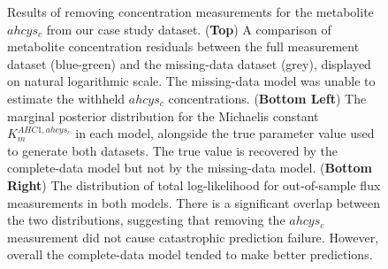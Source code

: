 \documentclass[journal=asbcd6,manuscript=article,layout=traditional]{achemso}
\begin{document}
\begin{figure}

\begin{minipage}[t]{\linewidth}

{\centering 


}

\end{minipage}%

\caption{\label{fig-missing}Results of removing concentration
measurements for the metabolite \(ahcys_c\) from our case study dataset.
(\textbf{Top}) A comparison of metabolite concentration residuals
between the full measurement dataset (blue-green) and the missing-data
dataset (grey), displayed on natural logarithmic scale. The missing-data
model was unable to estimate the withheld \(ahcys_c\) concentrations.
(\textbf{Bottom Left}) The marginal posterior distribution for the
Michaelis constant \(K_m^{AHC1,ahcys_c}\) in each model, alongside the
true parameter value used to generate both datasets. The true value is
recovered by the complete-data model but not by the missing-data model.
(\textbf{Bottom Right}) The distribution of total log-likelihood for
out-of-sample flux measurements in both models. There is a significant
overlap between the two distributions, suggesting that removing the
\(ahcys_c\) measurement did not cause catastrophic prediction failure.
However, overall the complete-data model tended to make better
predictions.}

\end{figure}
\end{document}
